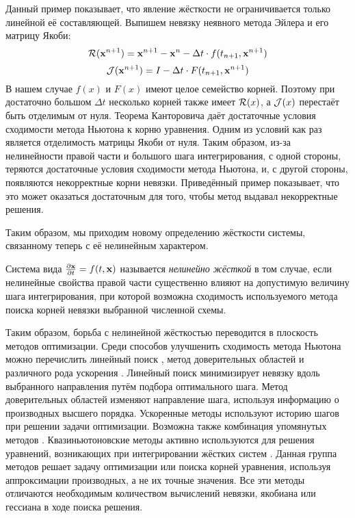 Данный пример показывает, что явление жёсткости не ограничивается только линейной её составляющей.
Выпишем невязку неявного метода Эйлера и его матрицу Якоби:
%
\begin{equation}
    \label{eq:implicit_Euler_residual}
    \mathcal{R}(\mathbf{x}^{n+1}) = \mathbf{x}^{n+1} - \mathbf{x}^n - \Delta t \cdot f(t_{n+1}, \mathbf{x}^{n+1})
\end{equation}
%
\begin{equation}
    \label{eq:implicit_Euler_jacobian}
    \mathcal{J}(\mathbf{x}^{n+1}) = I - \Delta t \cdot F(t_{n+1}, \mathbf{x}^{n+1})
\end{equation}
%
В нашем случае $ f(x) $ и $ F(x) $ имеют целое семейство корней.
Поэтому при достаточно большом $ \Delta t $ несколько корней также имеет $ \mathcal{R}(x) $,
а $ \mathcal{J}(x) $ перестаёт быть отделимым от нуля.
Теорема Канторовича \cite{kantorovich1949method,ortega2000iterative} даёт достаточные условия сходимости метода Ньютона к корню уравнения.
Одним из условий как раз является отделимость матрицы Якоби от нуля.
Таким образом, из-за нелинейности правой части и большого шага интегрирования, с одной стороны,
теряются достаточные условия сходимости метода Ньютона, и, с другой стороны, появляются некорректные корни невязки.
Приведённый пример показывает, что это может оказаться достаточным для того, чтобы метод выдавал некорректные решения.

Таким образом, мы приходим новому определению жёсткости системы,
связанному теперь с её нелинейным характером.

\begin{definition}
    \label{def:nonlinear_stiffness}
    Система вида $ \frac{\partial \mathbf{x}}{\partial t} = f(t, \mathbf{x}) $ называется \emph{нелинейно жёсткой} в том случае,
    если нелинейные свойства правой части существенно влияют на допустимую величину шага интегрирования,
    при которой возможна сходимость используемого метода поиска корней невязки выбранной численной схемы.
\end{definition}

Таким образом, борьба с нелинейной жёсткостью переводится в плоскость методов оптимизации.
Среди способов улучшенить сходимость метода Ньютона можно перечислить линейный поиск \cite{armijo1966minimization, wolfe1969convergence},
метод доверительных областей \cite{sorensen1982newton} и различного рода ускорения \cite{anderson1965iterative, nesterov27method, brown1994convergence}.
Линейный поиск минимизирует невязку вдоль выбранного направления путём подбора оптимального шага.
Метод доверительных областей изменяют направление шага, используя информацию о производных высшего порядка.
Ускоренные методы используют историю шагов при решении задачи оптимизации.
Возможна также комбинация упомянутых методов \cite{brune2015composing}.
Квазиньютоновские методы активно используются для решения уравнений, возникающих при интегрировании жёстких систем
\cite{brown1985experiments, alexander1991modified, moore1994stepsize, schlenkrich2006application}.
Данная группа методов решает задачу оптимизации или поиска корней уравнения, используя аппроксимации производных, а не их точные значения.
Все эти методы отличаются необходимым количеством вычислений невязки, якобиана или гессиана в ходе поиска решения.
